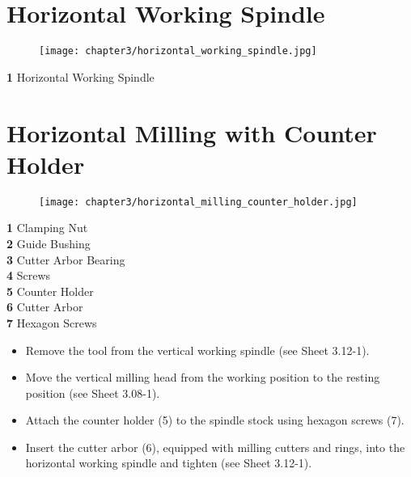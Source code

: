 \section{Horizontal Working Spindle}

\begin{figure}[h]
    \centering
    \texttt{[image: chapter3/horizontal\_working\_spindle.jpg]}
    \label{fig:horizontal_working_spindle}
\end{figure}

\noindent \textbf{1} \quad Horizontal Working Spindle

\vspace{.5cm}


\section{Horizontal Milling with Counter Holder}

\begin{figure}[h]
    \centering
    \texttt{[image: chapter3/horizontal\_milling\_counter\_holder.jpg]}
    \label{fig:horizontal_milling_counter_holder}
\end{figure}

\noindent \textbf{1} \quad Clamping Nut \\
\textbf{2} \quad Guide Bushing \\
\textbf{3} \quad Cutter Arbor Bearing \\
\textbf{4} \quad Screws \\
\textbf{5} \quad Counter Holder \\
\textbf{6} \quad Cutter Arbor \\
\textbf{7} \quad Hexagon Screws

\vspace{0.3cm}

\begin{itemize}
    \item Remove the tool from the vertical working spindle (see Sheet 3.12-1).
    \item Move the vertical milling head from the working position to the resting position (see Sheet 3.08-1).
    \item Attach the counter holder (5) to the spindle stock using hexagon screws (7).
    \item Insert the cutter arbor (6), equipped with milling cutters and rings, into the horizontal working spindle and tighten (see Sheet 3.12-1).
\end{itemize}

